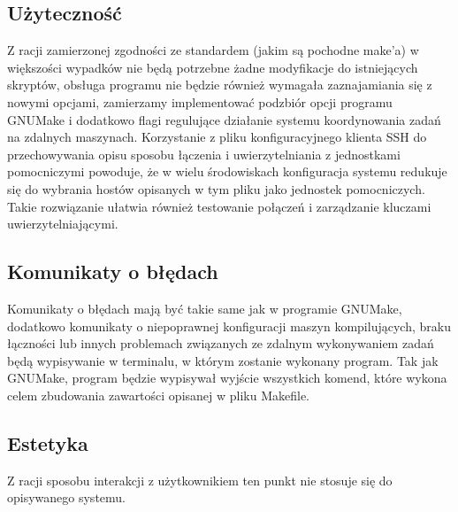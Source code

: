 \documentclass[a4paper]{article}
\begin{document}
\subsection{Użyteczność}

Z racji zamierzonej zgodności ze standardem (jakim są pochodne make’a) w większości wypadków nie będą potrzebne żadne modyfikacje do istniejących skryptów, obsługa programu nie będzie również wymagała zaznajamiania się z nowymi opcjami, zamierzamy implementować podzbiór opcji programu GNUMake i dodatkowo flagi regulujące działanie systemu koordynowania zadań na zdalnych maszynach.
Korzystanie z pliku konfiguracyjnego klienta SSH do przechowywania opisu sposobu łączenia i uwierzytelniania z jednostkami pomocniczymi powoduje, że w wielu środowiskach konfiguracja systemu redukuje się do wybrania hostów opisanych w tym pliku jako jednostek pomocniczych.
Takie rozwiązanie ułatwia również testowanie połączeń i zarządzanie kluczami uwierzytelniającymi.

\subsection{Komunikaty o błędach}

Komunikaty o błędach mają być takie same jak w programie GNUMake, dodatkowo komunikaty o niepoprawnej konfiguracji maszyn kompilujących, braku łączności lub innych problemach związanych ze zdalnym wykonywaniem zadań będą wypisywanie w terminalu, w którym zostanie wykonany program.
Tak jak GNUMake, program będzie wypisywał wyjście wszystkich komend, które wykona celem zbudowania zawartości opisanej w pliku Makefile.

\subsection{Estetyka}

Z racji sposobu interakcji z użytkownikiem ten punkt nie stosuje się do opisywanego systemu.
\end{document}
